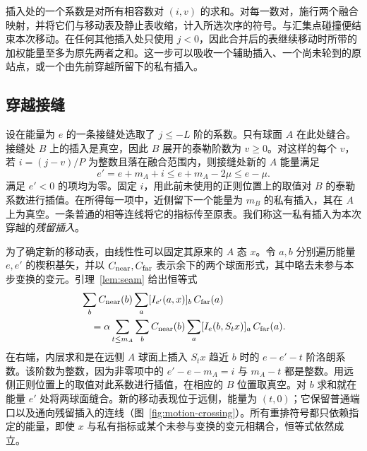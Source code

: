 插入处的一个系数是对所有相容数对 $(i,v)$ 的求和。对每一数对，施行两个融合映射，并将它们与移动表及静止表收缩，计入所选次序的符号。与汇集点碰撞便结束本次移动。在任何其他插入处只使用 $j<0$，因此合并后的表继续移动时所带的加权能量至多为原先两者之和。这一步可以吸收一个辅助插入、一个尚未轮到的原站点，或一个由先前穿越所留下的私有插入。

\subsection{穿越接缝}

设在能量为 $e$ 的一条接缝处选取了 $j\le-L$ 阶的系数。只有球面 $A$ 在此处缝合。接缝处 $B$ 上的插入是真空，因此 $B$ 展开的泰勒阶数为 $v\ge0$。对这样的每个 $v$，若 $i=(j-v)/P$ 为整数且落在融合范围内，则接缝处新的 $A$ 能量满足
\begin{equation}
       e'=e+m_A+i\le e+m_A-2\mu\le e-\mu .             \label{eq:motion-drop}
\end{equation} 满足 $e'<0$ 的项均为零。固定 $i$，用此前未使用的正则位置上的取值对 $B$ 的泰勒系数进行插值。在所得每一项中，近侧留下一个能量为 $m_B$ 的私有插入，其在 $A$ 上为真空。一条普通的相等连线将它的指标传至原表。我们称这一私有插入为本次穿越的\emph{残留插入}。

为了确定新的移动表，由线性性可以固定其原来的 $A$ 态 $x$。令 $a,b$ 分别遍历能量 $e,e'$ 的楔积基矢，并以 $C_{\rm near},C_{\rm far}$ 表示余下的两个球面形式，其中略去未参与本步变换的变元。引理~\ref{lem:seam} 给出恒等式 \[
\begin{aligned}
 &\sum_b C_{\rm near}(b)\sum_a [I_{e'}(a,x)]_b\,C_{\rm far}(a)\\
 &\hspace{1em}=\alpha\sum_{t\le m_A}\sum_b C_{\rm near}(b)
                      \sum_a [I_e(b,S_t x)]_a\,C_{\rm far}(a).
\end{aligned}
\] 在右端，内层求和是在远侧 $A$ 球面上插入 $S_t x$ 趋近 $b$ 时的 $e-e'-t$ 阶洛朗系数。该阶数为整数，因为非零项中的 $e'-e-m_A=i$ 与 $m_A-t$ 都是整数。用远侧正则位置上的取值对此系数进行插值，在相应的 $B$ 位置取真空。对 $b$ 求和就在能量 $e'$ 处将两球面缝合。新的移动表现位于远侧，能量为 $(t,0)$；它保留普通端口以及通向残留插入的连线（图~\ref{fig:motion-crossing}）。所有重排符号都只依赖指定的能量，即使 $x$ 与私有指标或某个未参与变换的变元相耦合，恒等式依然成立。

